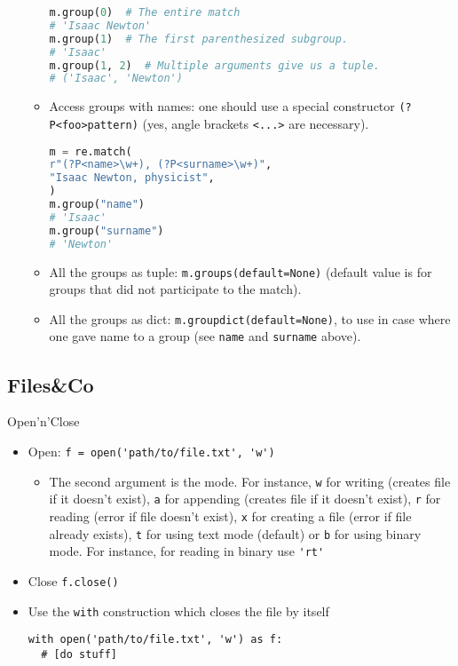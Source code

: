 \documentclass[a4paper,12pt,%
              final%
              ]{article}
\begin{document}
\begin{itemize}
\begin{itemize}
\begin{lstlisting}[language=python]
m.group(0)  # The entire match
# 'Isaac Newton'
m.group(1)  # The first parenthesized subgroup.
# 'Isaac'
m.group(1, 2)  # Multiple arguments give us a tuple.
# ('Isaac', 'Newton')
\end{lstlisting}
      \item Access groups with names: one should use a special constructor \texttt{(?P<foo>pattern)} (yes, angle brackets \texttt{<...>} are necessary).
\begin{lstlisting}[language=python]
m = re.match(
r"(?P<name>\w+), (?P<surname>\w+)",
"Isaac Newton, physicist",
)
m.group("name")
# 'Isaac'
m.group("surname")
# 'Newton'
\end{lstlisting}
      \item All the groups as tuple: \verb|m.groups(default=None)| (default value is for groups that did not participate to the match).
      \item All the groups as dict: \verb|m.groupdict(default=None)|, to use in case where one gave name to a group (see \texttt{name} and \texttt{surname} above).
    \end{itemize}
\end{itemize}

\subsection{Files\&Co}
Open'n'Close
\begin{itemize}
  \item Open: \verb|f = open('path/to/file.txt', 'w')|
    \begin{itemize}
      \item The second argument is the mode. For instance, \verb|w| for writing (creates file if it doesn't exist), \verb|a| for appending (creates file if it doesn't exist), \verb|r| for reading (error if file doesn't exist), \verb|x| for creating a file (error if file already exists), \verb|t| for using text mode (default) or \verb|b| for using binary mode. For instance, for reading in binary use \verb|'rt'|
    \end{itemize}
  \item Close \verb|f.close()|
  \item Use the \verb|with| construction which closes the file by itself
\begin{verbatim}
with open('path/to/file.txt', 'w') as f:
  # [do stuff]
\end{verbatim}
\end{itemize}
\end{document}
